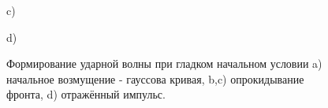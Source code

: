 \begin{figure}
\begin{minipage}[h]{0.47\linewidth}
\end{minipage}
\vfill
\begin{minipage}[h]{0.47\linewidth}
 c) \\
\end{minipage}
\hfill
\begin{minipage}[h]{0.47\linewidth}
 d) \\
\end{minipage}
\caption{Формирование ударной волны при гладком начальном условии a) начальное возмущение - гауссова кривая, b,c) опрокидывание фронта, d) отражённый импульс.}
\label{pic:udarnaya-volna}
\end{figure}

